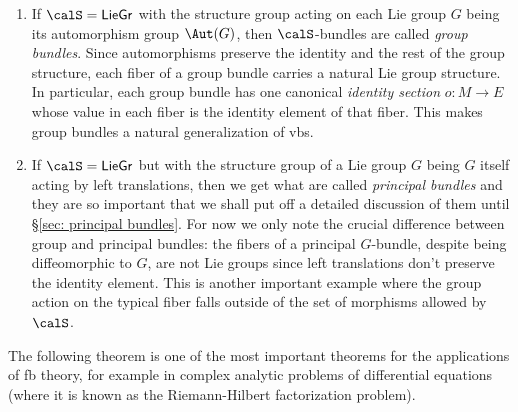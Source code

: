 \begin{example}\label{ex non-vector G-bundles}
    \begin{enumerate}
        \item If $\calS=\mathsf{LieGr}$ with the structure group acting on each Lie group $G$ being its automorphism group $\Aut(G)$, then $\calS$-bundles are called \emph{group bundles}. Since automorphisms preserve the identity and the rest of the group structure, each fiber of a group bundle carries a natural Lie group structure. In particular, each group bundle has one canonical \emph{identity section} $o:M\to E$ whose value in each fiber is the identity element of that fiber. This makes group bundles a natural generalization of \glspl{vb}. 
        
        \item If $\calS=\mathsf{LieGr}$ but with the structure group of a Lie group $G$ being $G$ itself acting by left translations, then we get what are called \emph{principal bundles} and they are so important that we shall put off a detailed discussion of them until \S\ref{sec: principal bundles}. For now we only note the crucial difference between group and principal bundles: the fibers of a principal $G$-bundle, despite being diffeomorphic to $G$, are not Lie groups since left translations don't preserve the identity element. This is another important example where the group action on the typical fiber falls outside of the set of morphisms allowed by $\calS$.
    \end{enumerate}
\end{example}

The following theorem is one of the most important theorems for the applications of \gls{fb} theory, for example in complex analytic problems of differential equations (where it is known as the Riemann-Hilbert factorization problem).

